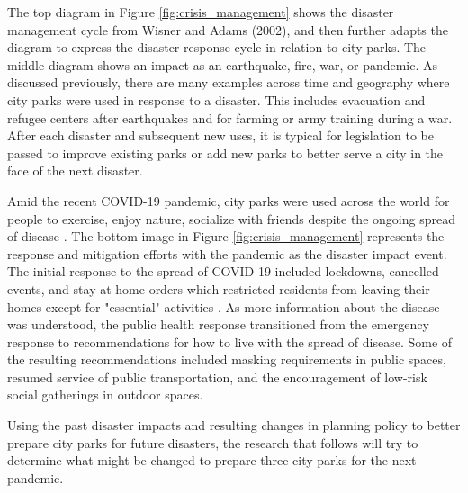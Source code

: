 \begin{multicols}{2}
The top diagram in Figure \ref{fig:crisis_management} shows the disaster management cycle from Wisner and Adams (2002), and then further adapts the diagram to express the disaster response cycle in relation to city parks. The middle diagram shows an impact as an earthquake, fire, war, or pandemic. As discussed previously, there are many examples across time and geography where city parks were used in response to a disaster. This includes evacuation and refugee centers after earthquakes and for farming or army training during a war. After each disaster and subsequent new uses, it is typical for legislation to be passed to improve existing parks or add new parks to better serve a city in the face of the next disaster. 

Amid the recent COVID-19 pandemic, city parks were used across the world for people to exercise, enjoy nature, socialize with friends despite the ongoing spread of disease \cite{bereitschaft_how_2020}. The bottom image in Figure \ref{fig:crisis_management} represents the response and mitigation efforts with the pandemic as the disaster impact event. The initial response to the spread of COVID-19 included lockdowns, cancelled events, and stay-at-home orders which restricted residents from leaving their homes except for "essential" activities \cite{storr_essential_2021}. As more information about the disease was understood, the public health response transitioned from the emergency response to recommendations for how to live with the spread of disease. Some of the resulting recommendations included masking requirements in public spaces, resumed service of public transportation, and the encouragement of low-risk social gatherings in outdoor spaces. 

Using the past disaster impacts and resulting changes in planning policy to better prepare city parks for future disasters, the research that follows will try to determine what might be changed to prepare three city parks for the next pandemic.

\end{multicols}

